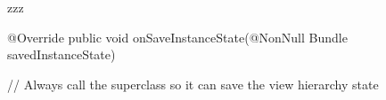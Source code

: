 zzz

@Override
    public void onSaveInstanceState(@NonNull Bundle savedInstanceState) {
        // Always call the superclass so it can save the view hierarchy state

    }
